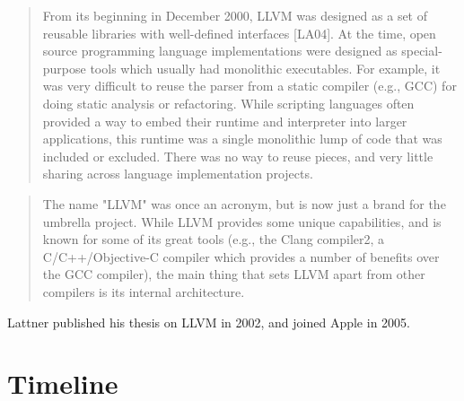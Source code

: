 \begin{quotation}
From its beginning in December 2000, LLVM was designed as a set of reusable 
libraries with well-defined interfaces [LA04]. At the time, open source 
programming language implementations were designed as special-purpose tools 
which usually had monolithic executables. For example, it was very difficult to 
reuse the parser from a static compiler (e.g., GCC) for doing static analysis 
or refactoring. While scripting languages often provided a way to embed their 
runtime and interpreter into larger applications, this runtime was a single 
monolithic lump of code that was included or excluded. There was no way to 
reuse pieces, and very little sharing across language implementation projects.
\cite{aosa_vol1}
\end{quotation}

\begin{quotation}
The name "LLVM" was once an acronym, but is now just a brand for the umbrella 
project. While LLVM provides some unique capabilities, and is known for some of 
its great tools (e.g., the Clang compiler2, a C/C++/Objective-C compiler which 
provides a number of benefits over the GCC compiler), the main thing that sets 
LLVM apart from other compilers is its internal architecture.
\cite[LLVM]{aosa_vol1}
\end{quotation}

Lattner published his thesis on LLVM in 2002, and joined Apple in 2005.

\pagebreak
\section{Timeline}

